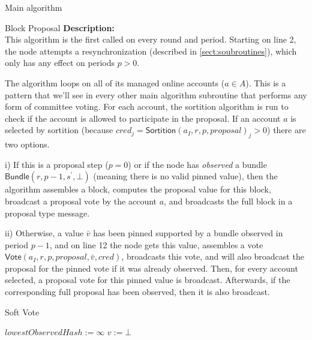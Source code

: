 \documentclass[10pt,a4paper]{article}
\begin{document}
\begin{section}{Main algorithm}
\begin{subsection}{Block Proposal}
\newpage
\noindent \textbf{Description:}\\
This algorithm is the first called on every round and period. 
Starting on line 2, the node attempts a resynchronization (described in \ref{sect:soubroutines}), which
only has any effect on periods $p > 0$.

The algorithm loops on all of its managed online accounts ($a\in A$). 
This is a pattern that we'll see in every other main algorithm subroutine 
that performs any form of committee voting.
For each account, the sortition algorithm is run to check if the account is allowed 
to participate in the proposal. 
If an account $a$ is selected by sortition (because $cred_j=\mathsf{Sortition}(a_I, r,p,proposal)_j>0$)
there are two options. 

i) If this is a proposal step ($p=0$) or if the node has {\em observed} a bundle 
$\mathsf{Bundle}(r, p-1, s^\prime, \bot)$ (meaning there is no valid pinned value), 
then the algorithm assembles a block, computes the proposal value for this block, 
broadcast a proposal vote by the account $a$, and broadcasts the full block in a 
proposal type message.

ii) Otherwise, a value $\bar v$ has been pinned supported by a bundle observed in 
period $p-1$, and on line 12 the node gets this value, assembles a vote
$\mathsf{Vote}(a_I, r, p, proposal, \bar{v}, cred)$, broadcasts this vote,
and will also broadcast the proposal for the pinned vote if it was already
observed.
%
Then, for every account selected, a proposal vote for this pinned value is broadcast. Afterwards, 
if the corresponding full proposal has been observed, then it is also broadcast.


\end{subsection}
\begin{subsection}{Soft Vote}\label{ssect:softvote}

\begin{algorithm}[H]
    \caption{\underline{Soft Vote}}
    \label{algo:soft-vote}
    \begin{algorithmic}[1]
    \State $lowestObservedHash := \infty$
    \State $v := \bot$ 


\end{algorithmic}
\end{algorithm}
\end{subsection}
\end{section}
\end{document}
